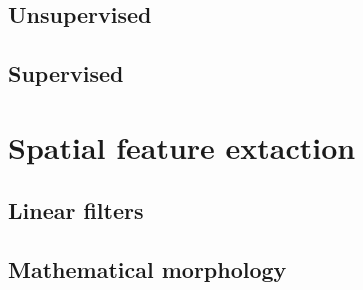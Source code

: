 \documentclass[10pt,aspectratio=1610]{beamer}
\begin{document}
\subsection{Unsupervised}
\label{sec:org6db8f84}

\subsection{Supervised}
\label{sec:org812a1cd}

\section{Spatial feature extaction}
\label{sec:orgbbd3772}

\subsection{Linear filters}
\label{sec:orgc47f32e}

\subsection{Mathematical morphology}
\label{sec:org5af4d09}
\end{document}
